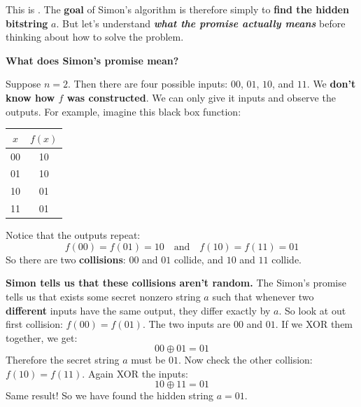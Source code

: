 \noindent
This is . The \textbf{goal} of Simon's algorithm is therefore simply to \textbf{find the hidden bitstring} $a$. But let's understand \textbf{\emph{what the promise actually means}} before thinking about how to solve the problem.

\highspace
\begin{flushleft}
    \textcolor{Green3}{ \textbf{What does Simon's promise mean?}}
\end{flushleft}
Suppose $n = 2$. Then there are four possible inputs: $00$, $01$, $10$, and $11$. We \textbf{don't know how $f$ was constructed}. We can only give it inputs and observe the outputs. For example, imagine this black box function:
\begin{center}
    \begin{tabular}{@{} c c @{}}
        \toprule
        $x$ & $f(x)$ \\
        \midrule
        00 & 10 \\
        01 & 10 \\
        10 & 01 \\
        11 & 01 \\
        \bottomrule
    \end{tabular}
\end{center}

\noindent
Notice that the outputs repeat:
\begin{equation*}
    f(00) = f(01) = 10 \quad \text{and} \quad f(10) = f(11) = 01
\end{equation*}
So there are two \textbf{collisions}: $00$ and $01$ collide, and $10$ and $11$ collide.

\highspace
\textcolor{Green3}{ \textbf{Simon tells us that these collisions aren't random.}} The Simon's promise tells us that exists some secret nonzero string $a$ such that whenever two \textbf{different} inputs have the same output, they differ exactly by $a$. So look at out first collision: $f(00) = f(01)$. The two inputs are $00$ and $01$. If we XOR them together, we get:
\begin{equation*}
    00 \oplus 01 = 01
\end{equation*}
Therefore the secret string $a$ must be $01$. Now check the other collision: $f(10) = f(11)$. Again XOR the inputs:
\begin{equation*}
    10 \oplus 11 = 01
\end{equation*}
Same result! So we have found the hidden string $a = 01$.

